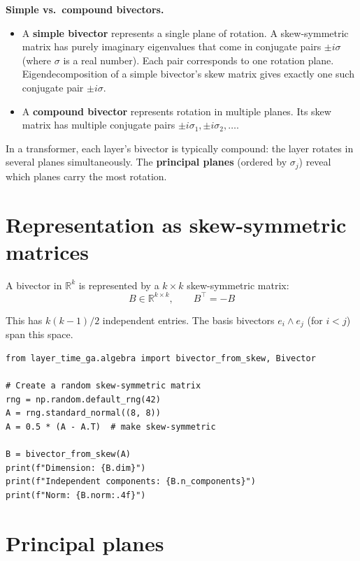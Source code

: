 \documentclass[11pt, twoside, openright]{memoir}
\newcommand{\op}{\wedge}          %
\numberwithin{equation}{chapter}
\begin{document}
\begin{gabox}
\textbf{Simple vs.\ compound bivectors.}

\begin{itemize}[nosep]
\item A \textbf{simple bivector} represents a single plane of rotation.
  A skew-symmetric matrix has purely imaginary eigenvalues that come in
  conjugate pairs $\pm i\sigma$ (where $\sigma$ is a real number).  Each
  pair corresponds to one rotation plane.  Eigendecomposition of a simple
  bivector's skew matrix gives exactly one such conjugate pair
  $\pm i\sigma$.
\item A \textbf{compound bivector} represents rotation in multiple planes.
  Its skew matrix has multiple conjugate pairs
  $\pm i\sigma_1, \pm i\sigma_2, \ldots$.
\end{itemize}
In a transformer, each layer's bivector is typically compound: the layer
rotates in several planes simultaneously.  The \textbf{principal planes}
(ordered by $\sigma_j$) reveal which planes carry the most rotation.
\end{gabox}

\section{Representation as skew-symmetric matrices}

A bivector in $\mathbb{R}^k$ is represented by a $k \times k$
skew-symmetric matrix:
\begin{equation}
  B \in \mathbb{R}^{k \times k}, \qquad B^\top = -B
\end{equation}

This has $k(k-1)/2$ independent entries.  The basis bivectors
$e_i \op e_j$ (for $i < j$) span this space.

\begin{lstlisting}[caption={Creating and inspecting a bivector}]
from layer_time_ga.algebra import bivector_from_skew, Bivector

# Create a random skew-symmetric matrix
rng = np.random.default_rng(42)
A = rng.standard_normal((8, 8))
A = 0.5 * (A - A.T)  # make skew-symmetric

B = bivector_from_skew(A)
print(f"Dimension: {B.dim}")
print(f"Independent components: {B.n_components}")
print(f"Norm: {B.norm:.4f}")
\end{lstlisting}

\section{Principal planes}
\label{sec:principal-planes}
\end{document}
